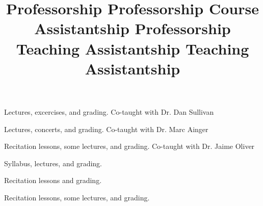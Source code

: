 \title{ Professorship }
\begin{position}
Lectures, excercises, and grading. Co-taught with Dr. Dan Sullivan
\end{position}


\title{ Professorship }
\begin{position}
Lectures, concerts, and grading. Co-taught with Dr. Marc Ainger
\end{position}


\title{ Course Assistantship }
\begin{position}
Recitation lessons, some lectures, and grading. Co-taught with Dr. Jaime Oliver
\end{position}

\title{ Professorship }
\begin{position} 
Syllabus, lectures, and grading. 
\end{position}


\title{ Teaching Assistantship }
\begin{position}
Recitation lessons and grading.
\end{position}


\title{ Teaching Assistantship}
\begin{position}
Recitation lessons, some lectures, and grading. 
\end{position}

